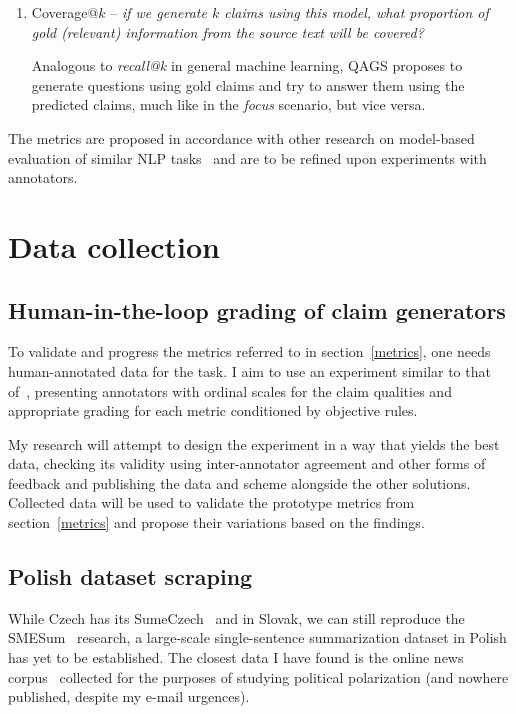 \begin{enumerate}
    \item {\techbf Coverage}$@k$ -- \textit{if we generate $k$ claims using this model, what proportion of gold (relevant) information from the source text will be covered?}
    
    Analogous to \textit{recall@k} in general machine learning, QAGS proposes to generate questions using gold claims and try to answer them using the predicted claims, much like in the \textit{focus} scenario, but vice versa.
\end{enumerate}
The metrics are proposed in accordance with other research on model-based evaluation of similar NLP tasks~\cite{ffci,wright} and are to be refined upon experiments with annotators.

\section{Data collection}
\subsection{Human-in-the-loop grading of claim generators}
To validate and progress the metrics referred to in section~\ref{metrics}, one needs human-annotated data for the task.
I aim to use an experiment similar to that of~\cite{wright}, presenting annotators with ordinal scales for the claim qualities and appropriate grading for each metric conditioned by objective rules.

My research will attempt to design the experiment in a way that yields the best data, checking its validity using inter-annotator agreement and other forms of feedback and publishing the data and scheme alongside the other solutions. 
Collected data will be used to validate the prototype metrics from section~\ref{metrics} and propose their variations based on the findings.

\subsection{Polish dataset scraping}
While Czech has its SumeCzech~\cite{straka-etal-2018-sumeczech} and in Slovak, we can still reproduce the SMESum~\cite{suppa-adamec-2020-summarization} research, a large-scale single-sentence summarization dataset in Polish has yet to be established.
The closest data I have found is the online news corpus~\cite{szwoch-etal-2022-creation} collected for the purposes of studying political polarization (and nowhere published, despite my e-mail urgences).

